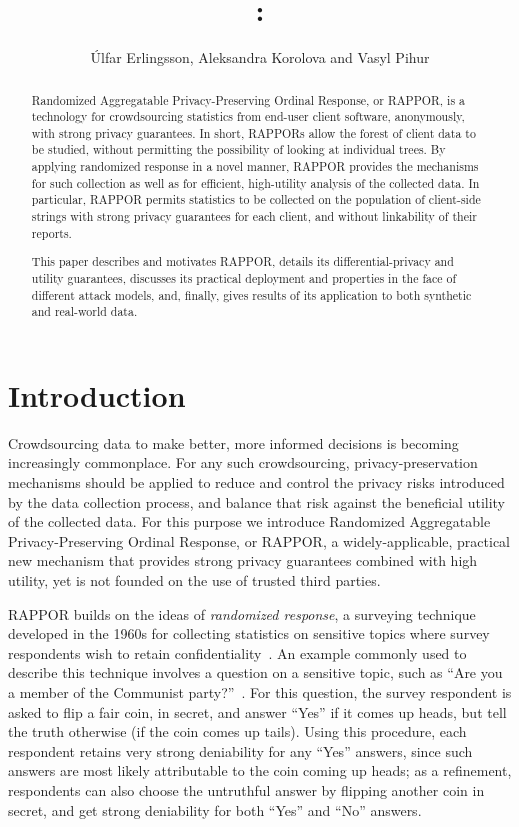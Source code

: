 \documentclass{sig-alternate-2013}
\title{\RAPPOR{}: \RAPPORSPELLEDOUT{}}
\author{{\'{U}}lfar Erlingsson, Aleksandra Korolova and Vasyl Pihur}
\newcommand\RAPPOR{{RAPPOR}}
\newcommand\RAPPORSPELLEDOUT{{Randomized Aggregatable Privacy-Preserving Ordinal Response}}
\begin{document}
\maketitle


\begin{abstract}
\RAPPORSPELLEDOUT{},
or \RAPPOR{}, is a technology for crowdsourcing statistics from end-user client software, 
anonymously, with strong privacy guarantees.  
In short, \RAPPOR{}s allow the forest of client data to be studied, 
without permitting the possibility of looking at individual trees.
By applying randomized response in a novel manner,
\RAPPOR{} provides the mechanisms for such collection as well as for efficient, 
high-utility analysis of the collected data.
In particular, \RAPPOR{} permits statistics to be collected
on the population of client-side strings
with strong privacy guarantees for each client,
and without linkability of their reports.

This paper
describes and motivates \RAPPOR{},
details its differential-privacy and utility guarantees,
discusses its practical deployment and properties in the face of different attack models,
and, finally, gives results of its application
to both synthetic and real-world data.
\end{abstract}



\section{Introduction}
Crowdsourcing data to make better, more informed decisions is becoming increasingly commonplace. 
For any such crowdsourcing,
privacy-preservation mechanisms should be applied 
to reduce and control the privacy risks introduced by the data collection process,
and balance that risk against the beneficial utility of the collected data.
For this purpose we introduce
\RAPPORSPELLEDOUT{},
or \RAPPOR{},
a widely-applicable, practical new mechanism that provides strong privacy guarantees 
combined with high utility,
yet is not founded on the use of trusted third parties.


\RAPPOR{} builds on the ideas of \textit{randomized response}, a surveying technique developed in the 1960s for collecting statistics on sensitive topics where survey respondents wish to retain confidentiality~\citep{warner}.
An example commonly used to describe this technique involves a question on a sensitive topic, such as ``Are you a member of the Communist party?''~\cite{WikipediaRR}. For this question, the survey respondent is asked to flip a fair coin, in secret, and answer ``Yes'' if it comes up heads, but tell the truth otherwise (if the coin comes up tails).
Using this procedure, each respondent retains very strong deniability for any ``Yes'' answers, since such answers are most likely attributable to the coin coming up heads; as a refinement, respondents can also choose the untruthful answer by flipping another coin in secret, and get strong deniability for both ``Yes'' and ``No'' answers.
\end{document}
